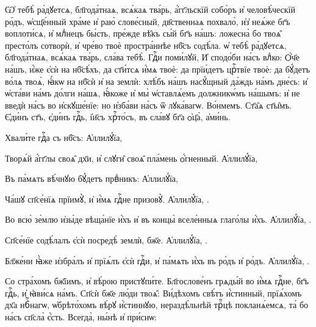 \hKv Ѡ҆ тебѣ̀ ра́дꙋетсѧ, бл҃года́тнаѧ, всѧ́каѧ тва́рь,  а҆́гг҃льскїй собо́ръ и҆ человѣ́ческїй ро́дъ, ѡ҆сщ҃е́нный  хра́ме и҆ раю̀ слове́сный, дв҃ственнаѧ похвало̀, и҆з̾  неѧ́же бг҃ъ воплоти́сѧ, и҆ млⷣнецъ бы́сть, пре́жде вѣ̑къ  сы́й бг҃ъ на́шъ: ложесна̀ бо твоѧ̑ престо́лъ сотворѝ, и҆  чре́во твоѐ простра́ннѣе нб҃съ содѣ́ла. ѡ҆ тебѣ̀  ра́дꙋетсѧ, бл҃года́тнаѧ, всѧ́каѧ тва́рь, сла́ва тебѣ̀. 
%
  Гдⷭ҇и поми́лꙋй,   И҆ сподо́би на́съ влⷣко: 
 \hKv  Ѻ҆́ч҃е на́шъ, и҆́же є҆сѝ на нб҃сѣ́хъ, да ст҃и́тсѧ и҆́мѧ  твоѐ: да прїи́детъ црⷭ҇твїе твоѐ:  да бꙋ́детъ во́лѧ твоѧ̀, ꙗ҆́кѡ на нб҃сѝ и҆ на землѝ:  хлѣ́бъ на́шъ насꙋ́щный да́ждь на́мъ дне́сь: и҆ ѡ҆ста́ви  на́мъ до́лги на́шѧ, ꙗ҆́коже и҆ мы̀ ѡ҆ставлѧ́емъ должникѡ́мъ  на́шымъ: и҆ не введѝ на́съ во и҆скꙋше́нїе: но и҆зба́ви  на́съ ѿ лꙋка́вагѡ. 
%
 Во́нмемъ. \hKv Ст҃а̑ѧ ст҃ы̑мъ.   Є҆ди́нъ ст҃ъ, є҆ди́нъ гдⷭ҇ь, і҆и҃съ хрⷭ҇то́съ, въ  сла́вꙋ бг҃а ѻ҆ц҃а̀, а҆ми́нь. 



\hKv Хвали́те гдⷭ҇а съ нб҃съ: А҆ллилꙋ́їа, 

%
Творѧ́й а҆́гг҃лы своѧ̑ дх҃и, и҆ слꙋги̑ своѧ̑ пла́мень  ѻ҆́гненный. А҆ллилꙋ́їа, 

Въ па́мѧть вѣ́чнꙋю бꙋ́детъ првⷣникъ: А҆ллилꙋ́їа,    

Ча́шꙋ сп҃се́нїѧ прїимꙋ̀, и҆ и҆́мѧ гдⷭ҇не призовꙋ̀.  А҆ллилꙋ́їа, . 

Во всю̀ зе́млю и҆зы́де вѣща́нїе и҆́хъ и҆ въ концы̀  вселе́нныѧ глаго́лы и҆́хъ. А҆ллилꙋ́їа, . 

Сп҃се́нїе содѣ́лалъ є҆сѝ посредѣ̀ землѝ, бж҃е.  А҆ллилꙋ́їа, . 

Бл҃же́ни ꙗ҆̀же и҆збра́лъ и҆ прїѧ́лъ є҆сѝ гдⷭ҇и, и҆  па́мѧть и҆́хъ въ ро́дъ и҆ ро́дъ. А҆ллилꙋ́їа, . 


\hKv Со стра́хомъ бж҃їимъ, и҆ вѣ́рою пристꙋпи́те.  
%
 Бл҃гослове́нъ грѧды́й во и҆́мѧ гдⷭ҇не, бг҃ъ гдⷭ҇ь,  и҆ ꙗ҆ви́сѧ на́мъ.  
%
 Сп҃сѝ бж҃е лю́ди твоѧ̑:  
%
 Ви́дѣхомъ свѣ́тъ и҆́стинный, прїѧ́хомъ дх҃а  нбⷭ҇нагѡ, ѡ҆брѣто́хомъ вѣ́рꙋ и҆́стиннꙋю, нераздѣ́льнѣй  трⷪ҇цѣ покланѧ́емсѧ, та́ бо на́съ сп҃сла̀ є҆́сть. 
%
 Всегда̀, ны́нѣ и҆ при́снѡ:  

